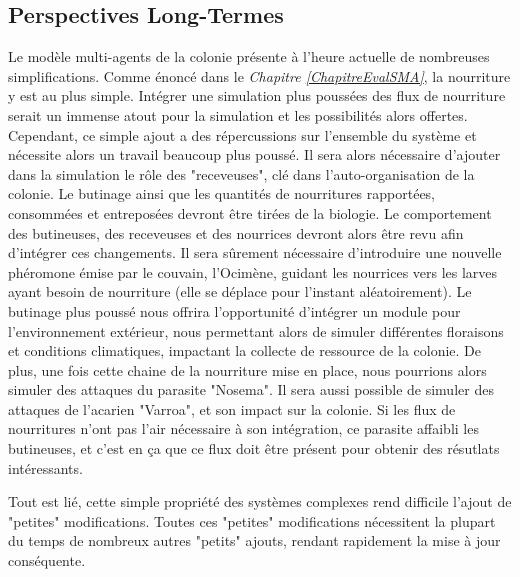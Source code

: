 	\subsection{Perspectives Long-Termes}
	Le modèle multi-agents de la colonie présente à l'heure actuelle de nombreuses simplifications. Comme énoncé dans le \textit{Chapitre \ref{ChapitreEvalSMA}}, la nourriture y est au plus simple. Intégrer une simulation plus poussées des flux de nourriture serait un immense atout pour la simulation et les possibilités alors offertes. Cependant, ce simple ajout a des répercussions sur l'ensemble du système et nécessite alors un travail beaucoup plus poussé. Il sera alors nécessaire d'ajouter dans la simulation le rôle des "receveuses", clé dans l'auto-organisation de la colonie. Le butinage ainsi que les quantités de nourritures rapportées, consommées et entreposées devront être tirées de la biologie. Le comportement des butineuses, des receveuses et des nourrices devront alors être revu afin d'intégrer ces changements. Il sera sûrement nécessaire d'introduire une nouvelle phéromone émise par le couvain, l'Ocimène, guidant les nourrices vers les larves ayant besoin de nourriture (elle se déplace pour l'instant aléatoirement). Le butinage plus poussé nous offrira l'opportunité d'intégrer un module pour l'environnement extérieur, nous permettant alors de simuler différentes floraisons et conditions climatiques, impactant la collecte de ressource de la colonie. De plus, une fois cette chaine de la nourriture mise en place, nous pourrions alors simuler des attaques du parasite "Nosema". Il sera aussi possible de simuler des attaques de l'acarien "Varroa", et son impact sur la colonie. Si les flux de nourritures n'ont pas l'air nécessaire à son intégration, ce parasite affaibli les butineuses, et c'est en ça que ce flux doit être présent pour obtenir des résutlats intéressants.
	
	Tout est lié, cette simple propriété des systèmes complexes rend difficile l'ajout de "petites" modifications. Toutes ces "petites" modifications nécessitent la plupart du temps de nombreux autres "petits" ajouts, rendant rapidement la mise à jour conséquente.
	